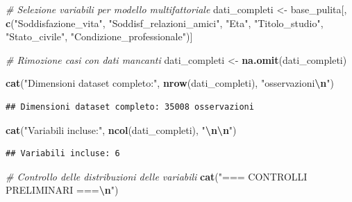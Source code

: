 \documentclass[
]{article}
\newenvironment{Shaded}{\begin{snugshade}}{\end{snugshade}}
\newcommand{\CommentTok}[1]{\textcolor[rgb]{0.56,0.35,0.01}{\textit{#1}}}
\newcommand{\FunctionTok}[1]{\textcolor[rgb]{0.13,0.29,0.53}{\textbf{#1}}}
\newcommand{\NormalTok}[1]{#1}
\newcommand{\OtherTok}[1]{\textcolor[rgb]{0.56,0.35,0.01}{#1}}
\newcommand{\SpecialCharTok}[1]{\textcolor[rgb]{0.81,0.36,0.00}{\textbf{#1}}}
\newcommand{\StringTok}[1]{\textcolor[rgb]{0.31,0.60,0.02}{#1}}
\begin{document}
\begin{Shaded}
\begin{Highlighting}[]
\CommentTok{\# Selezione variabili per modello multifattoriale}
\NormalTok{dati\_completi }\OtherTok{\textless{}{-}}\NormalTok{ base\_pulita[, }\FunctionTok{c}\NormalTok{(}\StringTok{"Soddisfazione\_vita"}\NormalTok{, }
                                \StringTok{"Soddisf\_relazioni\_amici"}\NormalTok{, }
                                \StringTok{"Eta"}\NormalTok{, }
                                \StringTok{"Titolo\_studio"}\NormalTok{, }
                                \StringTok{"Stato\_civile"}\NormalTok{, }
                                \StringTok{"Condizione\_professionale"}\NormalTok{)]}


\CommentTok{\# Rimozione casi con dati mancanti}
\NormalTok{dati\_completi }\OtherTok{\textless{}{-}} \FunctionTok{na.omit}\NormalTok{(dati\_completi)}

\FunctionTok{cat}\NormalTok{(}\StringTok{"Dimensioni dataset completo:"}\NormalTok{, }\FunctionTok{nrow}\NormalTok{(dati\_completi), }\StringTok{"osservazioni}\SpecialCharTok{\textbackslash{}n}\StringTok{"}\NormalTok{)}
\end{Highlighting}
\end{Shaded}

\begin{verbatim}
## Dimensioni dataset completo: 35008 osservazioni
\end{verbatim}

\begin{Shaded}
\begin{Highlighting}[]
\FunctionTok{cat}\NormalTok{(}\StringTok{"Variabili incluse:"}\NormalTok{, }\FunctionTok{ncol}\NormalTok{(dati\_completi), }\StringTok{"}\SpecialCharTok{\textbackslash{}n\textbackslash{}n}\StringTok{"}\NormalTok{)}
\end{Highlighting}
\end{Shaded}

\begin{verbatim}
## Variabili incluse: 6
\end{verbatim}

\begin{Shaded}
\begin{Highlighting}[]
\CommentTok{\# Controllo delle distribuzioni delle variabili}
\FunctionTok{cat}\NormalTok{(}\StringTok{"=== CONTROLLI PRELIMINARI ===}\SpecialCharTok{\textbackslash{}n}\StringTok{"}\NormalTok{)}
\end{Highlighting}
\end{Shaded}
\end{document}
